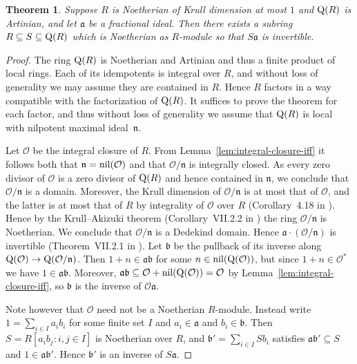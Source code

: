 \documentclass{amsart}
\theoremstyle{plain}
\newtheorem{theorem}{Theorem}[section]
\theoremstyle{definition}
\begin{document}
\begin{theorem}\label{thm:exist-invertible-extension}
Suppose \(R\) is Noetherian of Krull dimension at most \(1\) and \(\textup{Q}(R)\) is Artinian, and let \(\mathfrak{a}\) be a fractional ideal. 
Then there exists a subring \(R\subseteq S \subseteq\textup{Q}(R)\) which is Noetherian as \(R\)-module so that \(S\mathfrak{a}\) is invertible.
\end{theorem}
\begin{proof}
The ring \(\textup{Q}(R)\) is Noetherian and Artinian and thus a finite product of local rings. 
Each of its idempotents is integral over \(R\), and without loss of generality we may assume they are contained in \(R\).
Hence \(R\) factors in a way compatible with the factorization of \(\textup{Q}(R)\).
It suffices to prove the theorem for each factor, and thus without loss of generality we assume that \(\textup{Q}(R)\) is local with nilpotent maximal ideal~\(\mathfrak{n}\).

Let \(\mathcal{O}\) be the integral closure of \(R\). 
From Lemma~\ref{lem:integral-closure-iff} it follows both that \(\mathfrak{n}=\textup{nil}(\mathcal{O})\) and that \(\mathcal{O}/\mathfrak{n}\) is integrally closed.
As every zero divisor of $\mathcal{O}$ is a zero divisor of $\textup{Q}(R)$ and hence contained in $\mathfrak{n}$, we conclude that $\mathcal{O}/\mathfrak{n}$ is a domain.
Moreover, the Krull dimension of \(\mathcal{O}/\mathfrak{n}\) is at most that of \(\mathcal{O}\), and the latter is at most that of \(R\) by integrality of \(\mathcal{O}\) over \(R\) (Corollary~4.18 in \cite{Eisenbud}).
Hence by the Krull--Akizuki theorem (Corollary~VII.2.2 in \cite{Bourbaki}) the ring \(\mathcal{O}/\mathfrak{n}\) is Noetherian.
We conclude that \(\mathcal{O}/\mathfrak{n}\) is a Dedekind domain.
Hence \(\mathfrak{a}\cdot(\mathcal{O}/\mathfrak{n})\) is invertible (Theorem~VII.2.1 in \cite{Bourbaki}). 
Let \(\mathfrak{b}\) be the pullback of its inverse along \(\textup{Q}(\mathcal{O})\to\textup{Q}(\mathcal{O}/\mathfrak{n})\).
Then \(1+n\in \mathfrak{a}\mathfrak{b}\) for some \(n\in\textup{nil}(\textup{Q}(\mathcal{O}))\), but since \(1+n\in\mathcal{O}^*\) we have \(1\in\mathfrak{a}\mathfrak{b}\).
Moreover, \(\mathfrak{a}\mathfrak{b}\subseteq \mathcal{O}+\textup{nil}(\textup{Q}(\mathcal{O}))=\mathcal{O}\) by Lemma~\ref{lem:integral-closure-iff}, so \(\mathfrak{b}\) is the inverse of \(\mathcal{O}\mathfrak{a}\).

Note however that \(\mathcal{O}\) need not be a Noetherian \(R\)-module.
Instead write \(1=\sum_{i\in I}a_ib_i\) for some finite set \(I\) and \(a_i\in\mathfrak{a}\) and \(b_i\in\mathfrak{b}\).
Then \(S=R[a_ib_j : i,j\in I]\) is Noetherian over \(R\), and \(\mathfrak{b}'=\sum_{i\in I} S b_i\) satisfies \(\mathfrak{a}\mathfrak{b}'\subseteq S\) and \(1\in \mathfrak{a}\mathfrak{b}'\).
Hence \(\mathfrak{b}'\) is an inverse of \(S\mathfrak{a}\).
\end{proof}
\end{document}
